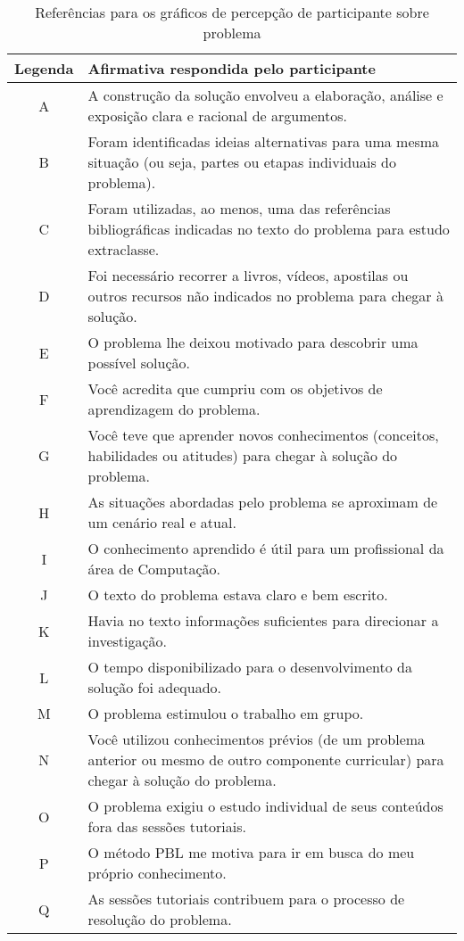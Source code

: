 \begin{table}[h]
\caption{Referências para os gráficos de percepção de participante sobre problema}
\label{tabela-ref-graficos}
\begin{tabular}{c|p{14.6cm}}
Legenda & Afirmativa respondida pelo participante \\
\hline
A & A construção da solução envolveu a elaboração, análise e exposição clara e racional de argumentos.\\
\hline
B & Foram identificadas ideias alternativas para uma mesma situação (ou seja, partes ou etapas individuais do problema).\\
\hline
C & Foram utilizadas, ao menos, uma das referências bibliográficas indicadas no texto do problema para estudo extraclasse.\\
\hline
D & Foi necessário recorrer a livros, vídeos, apostilas ou outros recursos não indicados no problema para chegar à solução.\\
\hline
E & O problema lhe deixou motivado para descobrir uma possível solução.\\
\hline
F & Você acredita que cumpriu com os objetivos de aprendizagem do problema.\\
\hline
G & Você teve que aprender novos conhecimentos (conceitos, habilidades ou atitudes) para chegar à solução do problema.\\
\hline
H & As situações abordadas pelo problema se aproximam de um cenário real e atual.\\
\hline
I & O conhecimento aprendido é útil para um profissional da área de Computação.\\
\hline
J & O texto do problema estava claro e bem escrito.\\
\hline
K & Havia no texto informações suficientes para direcionar a investigação.\\
\hline
L & O tempo disponibilizado para o desenvolvimento da solução foi adequado.\\
\hline
M & O problema estimulou o trabalho em grupo.\\
\hline
N & Você utilizou conhecimentos prévios (de um problema anterior ou mesmo de outro componente curricular) para chegar à solução do problema.\\
\hline
O & O problema exigiu o estudo individual de seus conteúdos fora das sessões tutoriais.\\
\hline
P & O método PBL me motiva para ir em busca do meu próprio conhecimento.\\
\hline
Q & As sessões tutoriais contribuem para o processo de resolução do problema.\\

\end{tabular}
\end{table}
